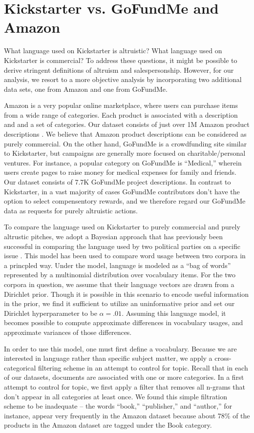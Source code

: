 \documentclass[letterpaper]{article}
\begin{document}
\section{Kickstarter vs. GoFundMe and Amazon}
What language used on Kickstarter is altruistic? What language used on Kickstarter is commercial? To address these questions, it might be possible to derive stringent definitions of altruism and salespersonship. However, for our analysis, we resort to a more objective analysis by incorporating two additional data sets, one from Amazon and one from GoFundMe.

Amazon is a very popular online marketplace, where users can purchase items from a wide range of categories. Each product is associated with a description and and a set of categories. Our dataset consists of just over 1M Amazon product descriptions \cite{mcauley2013hidden}. We believe that Amazon product descriptions can be considered as purely commercial. On the other hand, GoFundMe is a crowdfunding site similar to Kickstarter, but campaigns are generally more focused on charitable/personal ventures. For instance, a popular category on GoFundMe is ``Medical,'' wherein users create pages to raise money for medical expenses for family and friends. Our dataset consists of 7.7K GoFundMe project descriptions. In contrast to Kickstarter, in a vast majority of cases GoFundMe contributors don't have the option to select compensentory rewards, and we therefore regard our GoFundMe data as requests for purely altruistic actions.

To compare the language used on Kickstarter to purely commercial and purely altrustic pitches, we adopt a Bayesian approach that has previously been successful in comparing the language used by two political parties on a specific issue \cite{monroe2008fightin}. This model has been used to compare word usage between two corpora in a princpled way. Under the model, language is modeled as a ``bag of words'' represented by a multinomial distribution over vocabulary items. For the two corpora in question, we assume that their language vectors are drawn from a Dirichlet prior. Though it is possible in this scenario to encode useful information in the prior, we find it sufficient to utilize an uninformative prior and set our Dirichlet hyperparameter to be $\alpha=.01$. Assuming this language model, it becomes possible to compute approximate differences in vocabulary usages, and approximate variances of those differences.

In order to use this model, one must first define a vocabulary. Because we are interested in language rather than specific subject matter, we apply a cross-categorical filtering scheme in an attempt to control for topic. Recall that in each of our datasets, documents are associated with one or more categories. In a first attempt to control for topic, we first apply a filter that removes all n-grams that don't appear in all categories at least once. We found this simple filtration scheme to be inadequate -- the words ``book,'' ``publisher,'' and ``author,'' for instance, appear very frequently in the Amazon dataset because about 78\% of the products in the Amazon dataset are tagged under the Book category.
\end{document}
